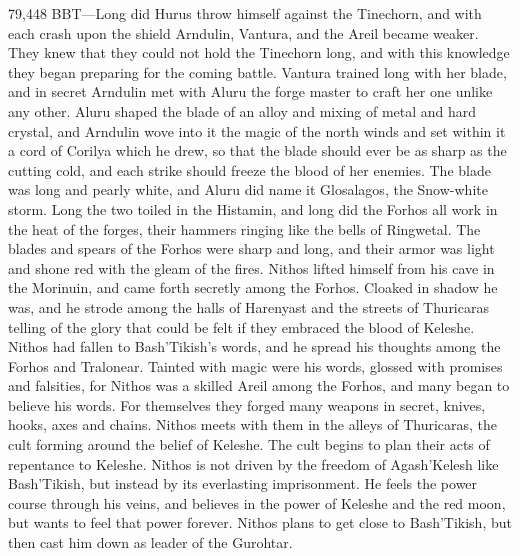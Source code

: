 \documentclass[smalldemyvopaper,11pt,twoside,onecolumn,openright,extrafontsizes]{memoir}
\begin{document}
79,448 BBT—Long did Hurus throw himself against the Tinechorn, and with each crash upon the shield Arndulin, Vantura, and the Areil became weaker. They knew that they could not hold the Tinechorn long, and with this knowledge they began preparing for the coming battle. Vantura trained long with her blade, and in secret Arndulin met with Aluru the forge master to craft her one unlike any other. Aluru shaped the blade of an alloy and mixing of metal and hard crystal, and Arndulin wove into it the magic of the north winds and set within it a cord of Corilya which he drew, so that the blade should ever be as sharp as the cutting cold, and each strike should freeze the blood of her enemies. The blade was long and pearly white, and Aluru did name it Glosalagos, the Snow-white storm. Long the two toiled in the Histamin, and long did the Forhos all work in the heat of the forges, their hammers ringing like the bells of Ringwetal. The blades and spears of the Forhos were sharp and long, and their armor was light and shone red with the gleam of the fires.
	Nithos lifted himself from his cave in the Morinuin, and came forth secretly among the Forhos. Cloaked in shadow he was, and he strode among the halls of Harenyast and the streets of Thuricaras telling of the glory that could be felt if they embraced the blood of Keleshe. Nithos had fallen to Bash’Tikish’s words, and he spread his thoughts among the Forhos and Tralonear. Tainted with magic were his words, glossed with promises and falsities, for Nithos was a skilled Areil among the Forhos, and many began to believe his words. For themselves they forged many weapons in secret, knives, hooks, axes and chains. Nithos meets with them in the alleys of Thuricaras, the cult forming around the belief of Keleshe. The cult begins to plan their acts of repentance to Keleshe. Nithos is not driven by the freedom of Agash’Kelesh like Bash’Tikish, but instead by its everlasting imprisonment. He feels the power course through his veins, and believes in the power of Keleshe and the red moon, but wants to feel that power forever. Nithos plans to get close to Bash’Tikish, but then cast him down as leader of the Gurohtar.
\end{document}
